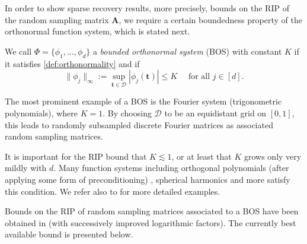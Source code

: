 \documentclass{svproc}
\newcommand{\corr}[1]{#1}
\newcommand{\bA}{\boldsymbol{A}}
\newcommand{\bt}{\boldsymbol{t}}
\newcommand{\0}{\boldsymbol{0}}
\newcommand{\1}{\boldsymbol{1}}
\newcommand{\calD}{\mathcal{D}}
\def\C{\mathbb{C}}
\def\calD{\mathcal{D}}
\begin{document}
In order to show sparse recovery results, more precisely, bounds on the RIP of the random sampling matrix $\bA$\corr{, we require} a certain boundedness property of the orthonormal function system, which is stated next.

\begin{definition}
    We call $\Phi =  \{\phi_1,\hdots,\phi_d\}$ a {\em bounded orthonormal system} (BOS) with constant $K$ 
    if it satisfies \eqref{def:orthonormality} and if
    \begin{equation}\label{def:KK}
    \|\phi_j \|_\infty := \sup_{\bt \in \calD} |\phi_j(\bt)| \leq K \quad \mbox{ for all } j \in [d] .
    \end{equation}
\end{definition}

The most prominent example of a BOS is the Fourier system (trigonometric polynomials), where $K=1$. By choosing $\calD$ to be an equidistant grid on $[0,1]$, this leads to randomly subsampled discrete Fourier matrices as associated random sampling matrices. 

It is important for the RIP bound that $K \lesssim 1$, or at least that $K$ grows only very mildly with $d$.
Many function systems including orthogonal polynomials (after applying some form of preconditioning) \cite{rawa10,rasc17}, spherical harmonics \cite{rawa16} and more satisfy this condition. We refer also to \cite[Chapter 12]{foucart2013mathematical} for more detailed examples.

Bounds on the RIP of random sampling matrices associated to a BOS  have been obtained in \cite{cata06,ru06-1,foucart2013mathematical,Bourgain2014RIP,Haviv15RIPFT,ChkifDextTranWebs16,BDJR21} (with successively improved logarithmic factors).
The currently best available bound \cite{Bourgain2014RIP,Haviv15RIPFT,ChkifDextTranWebs16,BDJR21} is presented below. 
\end{document}
